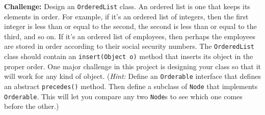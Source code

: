 \begin{EXRtwo}
\item  {\bf Challenge:} Design an {\tt OrderedList} class.  An ordered
list is one that keeps its elements in order.  For example, if it's an
ordered list of integers, then the first integer is less than or equal
to the second, the second is less than or equal to the third, and so
on.  If it's an ordered list of employees, then perhaps the employees
are stored in order according to their social security numbers.  The
{\tt OrderedList} class should contain an {\tt insert(Object o)}
method that inserts its object in the proper order.  One major
challenge in this project is designing your class so that it will work
for any kind of object.  ({\it Hint:} Define an {\tt Orderable} interface
that defines an abstract {\tt precedes()} method.  Then
define a subclass of {\tt Node} that implements {\tt Orderable}. This
will let you compare any two {\tt Node}s to see which one comes before
the other.)
\end{EXRtwo}
%